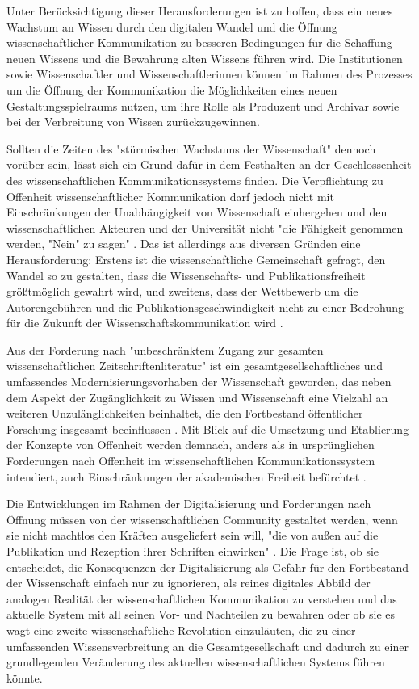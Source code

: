 Unter Berücksichtigung dieser Herausforderungen ist zu hoffen, dass ein neues Wachstum an Wissen durch den digitalen Wandel und die Öffnung wissenschaftlicher Kommunikation zu besseren Bedingungen für die Schaffung neuen Wissens und die Bewahrung alten Wissens führen wird. Die Institutionen sowie Wissenschaftler und Wissenschaftlerinnen können im Rahmen des Prozesses um die Öffnung der Kommunikation die Möglichkeiten eines neuen Gestaltungsspielraums nutzen, um ihre Rolle als Produzent und Archivar sowie bei der Verbreitung von Wissen zurückzugewinnen.

Sollten die Zeiten des "stürmischen Wachstums der Wissenschaft" \cite{Koelbel_2002} dennoch vorüber sein, lässt sich ein Grund dafür in dem Festhalten an der Geschlossenheit des wissenschaftlichen Kommunikationssystems finden. Die Verpflichtung zu Offenheit wissenschaftlicher Kommunikation darf jedoch nicht mit Einschränkungen der Unabhängigkeit von Wissenschaft einhergehen und den wissenschaftlichen Akteuren und der Universität nicht "die Fähigkeit genommen werden, "Nein" zu sagen" \cite[:12]{Neidhardt_2006}. Das ist allerdings aus diversen Gründen eine Herausforderung: Erstens ist die wissenschaftliche Gemeinschaft gefragt, den Wandel so zu gestalten, dass die Wissenschafts- und Publikationsfreiheit größtmöglich gewahrt wird, und zweitens, dass der Wettbewerb um die Autorengebühren und die Publikationsgeschwindigkeit nicht zu einer Bedrohung für die Zukunft der Wissenschaftskommunikation wird \cite{Beall_2012} \cite{Lossau_2007}.

Aus der Forderung nach "unbeschränktem Zugang zur gesamten wissenschaftlichen Zeitschriftenliteratur" \cite{BOAI_2012} ist ein gesamtgesellschaftliches und umfassendes Modernisierungsvorhaben der Wissenschaft geworden, das neben dem Aspekt der Zugänglichkeit zu Wissen und Wissenschaft eine Vielzahl an weiteren Unzulänglichkeiten beinhaltet, die den Fortbestand öffentlicher Forschung insgesamt beeinflussen \cite{Brembs_2015}. Mit Blick auf die Umsetzung und Etablierung der Konzepte von Offenheit werden demnach, anders als in ursprünglichen Forderungen nach Offenheit im wissenschaftlichen Kommunikationssystem intendiert, auch Einschränkungen der akademischen Freiheit befürchtet \cite{Hagner_2015}.

Die Entwicklungen im Rahmen der Digitalisierung und Forderungen nach Öffnung müssen von der wissenschaftlichen Community gestaltet werden, wenn sie nicht machtlos den Kräften ausgeliefert sein will, "die von außen auf die Publikation und Rezeption ihrer Schriften einwirken" \cite{Hirschi_2015}. Die Frage ist, ob sie entscheidet, die Konsequenzen der Digitalisierung als Gefahr für den Fortbestand der Wissenschaft einfach nur zu ignorieren, als reines digitales Abbild der analogen Realität der wissenschaftlichen Kommunikation zu verstehen und das aktuelle System mit all seinen Vor- und Nachteilen zu bewahren oder ob sie es wagt eine zweite wissenschaftliche Revolution einzuläuten, die zu einer umfassenden Wissensverbreitung an die Gesamtgesellschaft und dadurch zu einer grundlegenden Veränderung des aktuellen wissenschaftlichen Systems führen könnte.

